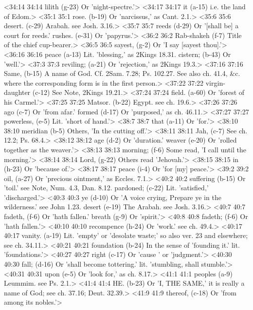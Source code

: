 <34:14 34:14  lilith (g-23)  Or 'night-spectre.'>
<34:17 34:17  it (a-15)  i.e. the land of Edom.>
<35:1 35:1  rose. (b-19)  Or 'narcissus,' as Cant. 2.1.>
<35:6 35:6  desert. (c-29)  Arabah. see Josh. 3.16.>
<35:7 35:7  reeds (d-29)  Or '[shall be] a court for reeds.'
  rushes. (e-31)  Or 'papyrus.'>
<36:2 36:2  Rab-shakeh (f-7)  Title of the chief cup-bearer.>
<36:5 36:5  sayest, (g-2)  Or 'I say [sayest thou].'>
<36:16 36:16  peace (a-13)  Lit. 'blessing,' as 2Kings 18.31.
  cistern; (b-43)  Or 'well.'>
<37:3 37:3  reviling; (a-21)  Or 'rejection,' as 2Kings 19.3.>
<37:16 37:16  Same, (b-15)  A name of God. Cf. 2Sam. 7.28; Ps. 102.27. See also ch.  41.4, &c. where the corresponding form is in the first person.>
<37:22 37:22  virgin-daughter (c-12)  See Note, 2Kings 19.21.>
<37:24 37:24  field. (a-60)  Or 'forest of his Carmel.'>
<37:25 37:25  Matsor. (b-22)  Egypt. see ch. 19.6.>
<37:26 37:26  ago (c-7)  Or 'from afar.'
  formed (d-17)  Or 'purposed,' as ch. 46.11.>
<37:27 37:27  powerless, (e-5)  Lit. 'short of hand.'>
<38:7 38:7  that (a-11)  Or 'for.'>
<38:10 38:10  meridian (b-5)  Others, 'In the cutting off.'>
<38:11 38:11  Jah, (c-7)  See ch. 12.2; Ps. 68.4.>
<38:12 38:12  age (d-2)  Or 'duration.'
  weaver (e-20)  Or 'rolled together as the weaver.'>
<38:13 38:13  morning; (f-6)  Some read, 'I call until the morning.'>
<38:14 38:14  Lord, (g-22)  Others read 'Jehovah.'>
<38:15 38:15  in (h-23)  Or 'because of.'>
<38:17 38:17  peace (i-4)  Or 'for [my] peace.'>
<39:2 39:2  oil, (a-27)  Or 'precious ointment,' as Eccles. 7.1.>
<40:2 40:2  suffering (b-15)  Or 'toil.' see Note, Num. 4.3, Dan. 8.12.
  pardoned; (c-22)  Lit. 'satisfied,' 'discharged.'>
<40:3 40:3  ye (d-10)  Or 'A voice crying, Prepare ye in the wilderness.' see John 1.23.
  desert (e-19)  The Arabah. see Josh. 3.16.>
<40:7 40:7  fadeth, (f-6) Or 'hath fallen.'
  breath (g-9)  Or 'spirit.'>
<40:8 40:8  fadeth; (f-6)  Or 'hath fallen.'>
<40:10 40:10  recompence (h-24)  Or 'work.' see ch. 49.4.>
<40:17 40:17  vanity. (a-19)  Lit. 'empty' or 'desolate waste;' so also ver. 23 and  elsewhere; see ch. 34.11.>
<40:21 40:21  foundation (b-24)  In the sense of 'founding it.' lit. 'foundations.'>
<40:27 40:27  right (c-17)  Or 'cause ' or 'judgment.'>
<40:30 40:30  fall; (d-16)  Or 'shall become tottering.' lit. 'stumbling, shall stumble.'>
<40:31 40:31  upon (e-5)  Or 'look for,' as ch. 8.17.>
<41:1 41:1  peoples (a-9)  Leummim. see Ps. 2.1.>
<41:4 41:4  HE. (b-23)  Or 'I, THE SAME,' it is really a name of God; see ch. 37.16;  Deut. 32.39.>
<41:9 41:9  thereof, (c-18)  Or 'from among its nobles.'>
